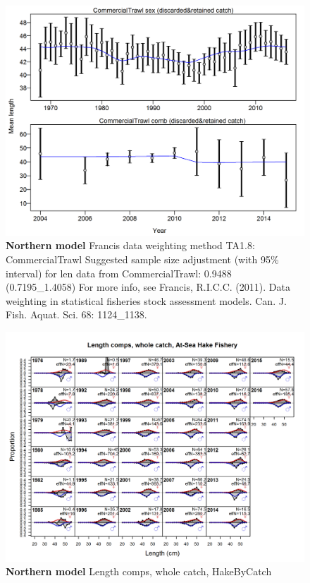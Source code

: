 \documentclass[12pt,]{article}
\begin{document}
\begin{figure}[htbp]
\centering
\includegraphics{./r4ss/plots_mod1/comp_lenfit_data_weighting_TA1.8_CommercialTrawl.png}
\caption{\textbf{Northern model} Francis data weighting method TA1.8:
CommercialTrawl Suggested sample size adjustment (with 95\% interval)
for len data from CommercialTrawl: 0.9488 (0.7195\_1.4058) For more
info, see Francis, R.I.C.C. (2011). Data weighting in statistical
fisheries stock assessment models. Can. J. Fish. Aquat. Sci. 68:
1124\_1138.
\label{fig:mod1_9_comp_lenfit_data_weighting_TA1.8_CommercialTrawl}}
\end{figure}

\begin{figure}[htbp]
\centering
\includegraphics{./r4ss/plots_mod1/comp_lenfit_flt2mkt0.png}
\caption{\textbf{Northern model} Length comps, whole catch, HakeByCatch
\label{fig:mod1_10_comp_lenfit_flt2mkt0}}
\end{figure}
\end{document}
